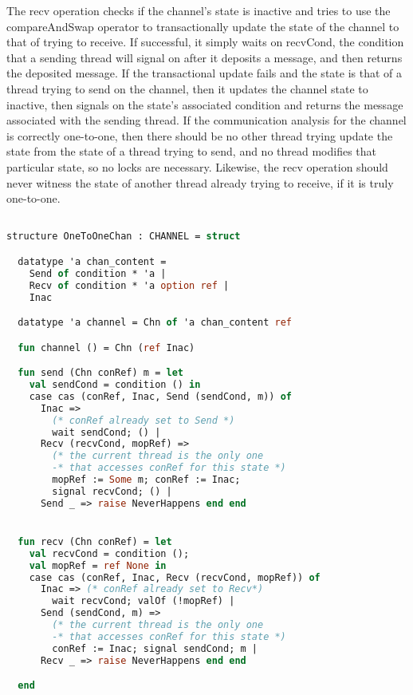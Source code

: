 \documentclass{article}
\begin{document}
The recv operation checks if the channel's state is inactive and tries to use the
compareAndSwap operator to transactionally update the state of the channel to that of trying
to receive.  If successful, it simply waits on recvCond, the condition that a sending thread
will signal on after it deposits a message, and then returns the deposited message.  If the
transactional update fails and the state is that of a thread trying to send on the channel,
then it updates the channel state to inactive, then signals on the state's associated
condition and returns the message associated with the sending thread.  If the communication
analysis for the channel is correctly one-to-one, then there should be no other thread trying
update the state from the state of a thread trying to send, and no thread modifies that
particular state, so no locks are necessary.  Likewise, the recv operation should never
witness the state of another thread already trying to receive, if it is truly one-to-one.

\begin{lstlisting}[language=ML, style=codestyle1, escapechar=\%]

structure OneToOneChan : CHANNEL = struct

  datatype 'a chan_content =
    Send of condition * 'a |
    Recv of condition * 'a option ref |
    Inac  

  datatype 'a channel = Chn of 'a chan_content ref

  fun channel () = Chn (ref Inac)

  fun send (Chn conRef) m = let
    val sendCond = condition () in
    case cas (conRef, Inac, Send (sendCond, m)) of
      Inac => 
        (* conRef already set to Send *)
        wait sendCond; () |
      Recv (recvCond, mopRef) =>
        (* the current thread is the only one
        -* that accesses conRef for this state *)
        mopRef := Some m; conRef := Inac;
        signal recvCond; () |
      Send _ => raise NeverHappens end end


  fun recv (Chn conRef) = let
    val recvCond = condition ();
    val mopRef = ref None in
    case cas (conRef, Inac, Recv (recvCond, mopRef)) of
      Inac => (* conRef already set to Recv*)
        wait recvCond; valOf (!mopRef) |
      Send (sendCond, m) =>
        (* the current thread is the only one
        -* that accesses conRef for this state *)
        conRef := Inac; signal sendCond; m |
      Recv _ => raise NeverHappens end end 

  end
  \end{lstlisting}
\end{document}
